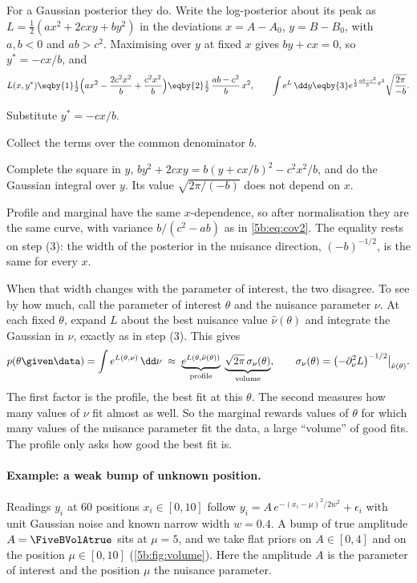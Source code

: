 For a Gaussian posterior they do. Write the log-posterior about its peak as
$L=\frac12(ax^2+2cxy+by^2)$ in the deviations $x=A-A_0$, $y=B-B_0$, with $a,b<0$ and
$ab>c^2$. Maximising over $y$ at fixed $x$ gives $by+cx=0$, so $y^\ast=-cx/b$, and
\begin{align*}
  L(x,y^\ast)
  \eqby{1}\tfrac12\Bigl(ax^2-\frac{2c^2x^2}{b}+\frac{c^2x^2}{b}\Bigr)
  \eqby{2}\tfrac12\,\frac{ab-c^2}{b}\,x^2 ,
  \qquad
  \int e^{L}\,\dd y
  \eqby{3}e^{\frac12\frac{ab-c^2}{b}x^2}\sqrt{\frac{2\pi}{-b}} .
\end{align*}
\begin{explain}
  \item Substitute $y^\ast=-cx/b$.
  \item Collect the terms over the common denominator $b$.
  \item Complete the square in $y$, $by^2+2cxy=b(y+cx/b)^2-c^2x^2/b$, and do the
        Gaussian integral over $y$. Its value $\sqrt{2\pi/(-b)}$ does not depend on $x$.
\end{explain}
Profile and marginal have the same $x$-dependence, so after normalisation they are the
same curve, with variance $b/(c^2-ab)$ as in \eqref{5b:eq:cov2}. The equality rests on
step (3): the width of the posterior in the nuisance direction, $(-b)^{-1/2}$, is the
same for every $x$.

When that width changes with the parameter of interest, the two disagree. To see by how
much, call the parameter of interest $\theta$ and the nuisance parameter $\nu$. At each
fixed $\theta$, expand $L$ about the best nuisance value $\hat\nu(\theta)$ and integrate
the Gaussian in $\nu$, exactly as in step (3). This gives
\begin{equation}
  p(\theta\given\data)=\int e^{L(\theta,\nu)}\,\dd\nu
  \;\approx\;\underbrace{e^{L(\theta,\hat\nu(\theta))}}_{\text{profile}}\;
  \underbrace{\sqrt{2\pi}\,\sigma_\nu(\theta)}_{\text{volume}},
  \qquad \sigma_\nu(\theta)=\bigl(-\partial_\nu^2L\bigr)^{-1/2}\big|_{\hat\nu(\theta)} .
  \label{5b:eq:volume}
\end{equation}
The first factor is the profile, the best fit at this $\theta$. The second measures how
many values of $\nu$ fit almost as well. So the marginal rewards values of $\theta$ for
which many values of the nuisance parameter fit the data, a large ``volume'' of good
fits. The profile only asks how good the best fit is.

\paragraph{Example: a weak bump of unknown position.}
Readings $y_i$ at 60 positions $x_i\in[0,10]$ follow $y_i=A\,e^{-(x_i-\mu)^2/2w^2}+
\epsilon_i$ with unit Gaussian noise and known narrow width $w=0.4$. A bump of true
amplitude $A=\FiveBVolAtrue$ sits at $\mu=5$, and we take flat priors on $A\in[0,4]$ and
on the position $\mu\in[0,10]$ (\cref{5b:fig:volume}). Here the amplitude $A$ is the
parameter of interest and the position $\mu$ the nuisance parameter.

